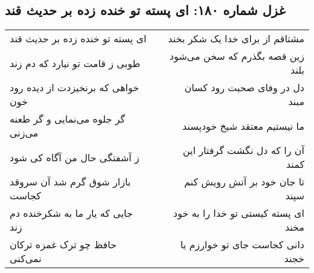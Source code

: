 \begin{center}
\section*{غزل شماره ۱۸۰: ای پسته تو خنده زده بر حدیث قند}
\label{sec:sh180}
\begin{longtable}{l p{0.5cm} r}
ای پسته تو خنده زده بر حدیث قند
&&
مشتاقم از برای خدا یک شکر بخند
\\
طوبی ز قامت تو نیارد که دم زند
&&
زین قصه بگذرم که سخن می‌شود بلند
\\
خواهی که برنخیزدت از دیده رود خون
&&
دل در وفای صحبت رود کسان مبند
\\
گر جلوه می‌نمایی و گر طعنه می‌زنی
&&
ما نیستیم معتقد شیخ خودپسند
\\
ز آشفتگی حال من آگاه کی شود
&&
آن را که دل نگشت گرفتار این کمند
\\
بازار شوق گرم شد آن سروقد کجاست
&&
تا جان خود بر آتش رویش کنم سپند
\\
جایی که یار ما به شکرخنده دم زند
&&
ای پسته کیستی تو خدا را به خود مخند
\\
حافظ چو ترک غمزه ترکان نمی‌کنی
&&
دانی کجاست جای تو خوارزم یا خجند
\\
\end{longtable}
\end{center}

